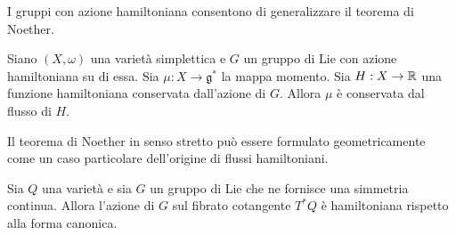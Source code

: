 I gruppi con azione hamiltoniana consentono di generalizzare il teorema di Noether.

\begin{theorem}
  Siano $(X,\omega)$ una varietà simplettica e $G$ un gruppo di Lie con azione hamiltoniana su di essa. Sia $\mu: X\to \mathfrak{g}^*$ la mappa momento. Sia $H: X\to \mathbb{R}$ una funzione hamiltoniana conservata dall'azione di $G$. Allora $\mu$ è conservata dal flusso di $H$.
\end{theorem}

Il teorema di Noether in senso stretto può essere formulato geometricamente come un caso particolare dell'origine di flussi hamiltoniani.
\begin{theorem}
  Sia $Q$ una varietà e sia $G$ un gruppo di Lie che ne fornisce una simmetria continua. Allora l'azione di $G$ sul fibrato cotangente $T^*Q$ è hamiltoniana rispetto alla forma canonica.
\end{theorem}